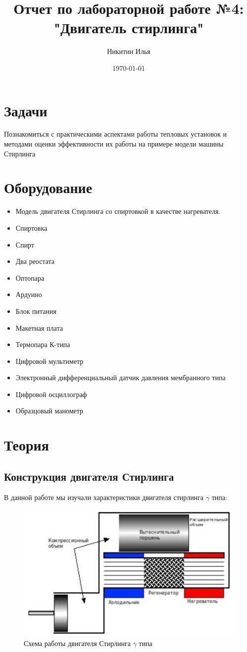 \documentclass[a4paper,14pt]{extarticle}
\author{Никитин Илья}
\title{Отчет по лабораторной работе №4: "Двигатель стирлинга"}
\date{\today}
\begin{document}
	
	\maketitle
	\tableofcontents

	\section{Задачи}
		Познакомиться с практическими аспектами работы тепловых установок и	методами оценки эффективности их работы на примере модели машины Стирлинга
	\section{Оборудование}
		\begin{itemize}
			\item Модель двигателя Стирлинга со спиртовкой в качестве нагревателя.
			\item Спиртовка
			\item Спирт
			\item Два реостата
			\item Оптопара
			\item Ардуино
			\item Блок питания
			\item Макетная плата
			\item Термопара К-типа
			\item Цифровой мультиметр
			\item Электронный дифференциальный датчик давления мембранного типа
			\item Цифровой осциллограф
			\item Образцовый манометр
		\end{itemize}
	\section{Теория}
		\subsection{Конструкция двигателя Стирлинга}
			В данной работе мы изучали характеристики двигателя стирлинга $\gamma$ типа:
			\begin{figure}[h!]
				\centering
				\includegraphics[width=.65\linewidth]{Lab4_2.png}
				\caption{Схема работы двигателя Стирлинга $\gamma$ типа}
				\label{fig1}
			\end{figure}
		
\end{document}
